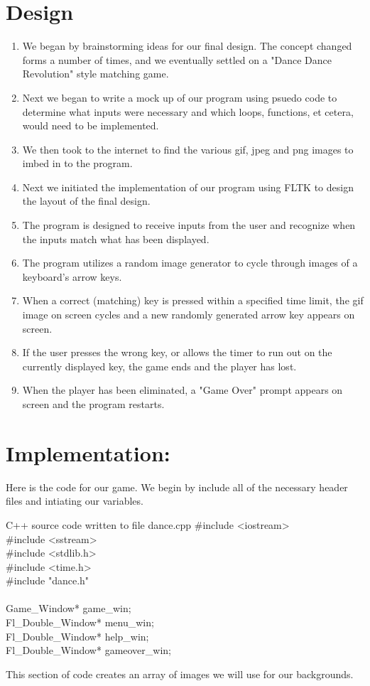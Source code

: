 \documentclass {article}
\begin{document}
\clearpage

\section*{Design}

\begin{enumerate}
\item We began by brainstorming ideas for our final design. The concept changed forms a number of times, and we eventually settled on a "Dance Dance Revolution" style matching game.
\item Next we began to write a mock up of our program using psuedo code to determine what inputs were necessary and which loops, functions, et cetera, would need to be implemented.
\item We then took to the internet to find the various gif, jpeg and png images to imbed in to the program.
\item Next we initiated the implementation of our program using FLTK to design the layout of the final design.
\item The program is designed to receive inputs from the user and recognize when the inputs match what has been displayed.
\item The program utilizes a random image generator to cycle through images of a keyboard's arrow keys.
\item When a correct (matching) key is pressed within a specified time limit, the gif image on screen cycles and a new randomly generated arrow key appears on screen.
\item If the user presses the wrong key, or allows the timer to run out on the currently displayed key, the game ends and the player has lost.
\item When the player has been eliminated, a "Game Over" prompt appears on screen and the program restarts.
\end{enumerate}

\section*{Implementation:}
Here is the code for our game. We begin by include all of the necessary header files and intiating our variables.

\begin{GFT}{C++ source code written to file dance.cpp}
\+\#include <iostream>\\
\+\#include <sstream>\\
\+\#include <stdlib.h>\\
\+\#include <time.h>\\
\+\#include "dance.h"\\
\+\\
\+Game\_Window* game\_win;\\
\+Fl\_Double\_Window* menu\_win;\\
\+Fl\_Double\_Window* help\_win;\\
\+Fl\_Double\_Window* gameover\_win;\\
\end{GFT}
\clearpage
This section of code creates an array of images we will use for our backgrounds.
\end{document}
